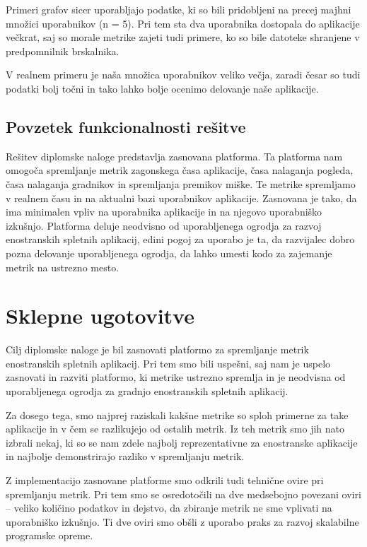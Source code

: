 \documentclass[a4paper, 12pt]{book}
\begin{document}
Primeri grafov sicer uporabljajo podatke, ki so bili pridobljeni na precej majhni množici uporabnikov (n = 5). Pri tem sta dva uporabnika dostopala do aplikacije večkrat, saj so morale metrike zajeti tudi primere, ko so bile datoteke shranjene v predpomnilnik brskalnika.

V realnem primeru je naša množica uporabnikov veliko večja, zaradi česar so tudi podatki bolj točni in tako lahko bolje ocenimo delovanje naše aplikacije.

\section{Povzetek funkcionalnosti rešitve}

Rešitev diplomske naloge predstavlja zasnovana platforma. Ta platforma nam omogoča spremljanje metrik zagonskega časa aplikacije, časa nalaganja pogleda, časa nalaganja gradnikov in spremljanja premikov miške. Te metrike spremljamo v realnem času in na aktualni bazi uporabnikov aplikacije. Zasnovana je tako, da ima minimalen vpliv na uporabnika aplikacije in na njegovo uporabniško izkušnjo. Platforma deluje neodvisno od uporabljenega ogrodja za razvoj enostranskih spletnih aplikacij, edini pogoj za uporabo je ta, da razvijalec dobro pozna delovanje uporabljenega ogrodja, da lahko umesti kodo za zajemanje metrik na ustrezno mesto.

\chapter{Sklepne ugotovitve}
\label{ch4}

Cilj diplomske naloge je bil zasnovati platformo za spremljanje metrik enostranskih spletnih aplikacij. Pri tem smo bili uspešni, saj nam je uspelo zasnovati in razviti platformo, ki metrike ustrezno spremlja in je neodvisna od uporabljenega ogrodja za gradnjo enostranskih spletnih aplikacij.

Za dosego tega, smo najprej raziskali kakšne metrike so sploh primerne za take aplikacije in v čem se razlikujejo od ostalih metrik. Iz teh metrik smo jih nato izbrali nekaj, ki so se nam zdele najbolj reprezentativne za enostranske aplikacije in najbolje demonstrirajo razliko v spremljanju metrik.

Z implementacijo zasnovane platforme smo odkrili tudi tehnične ovire pri spremljanju metrik. Pri tem smo se osredotočili na dve medsebojno povezani oviri -- veliko količino podatkov in dejstvo, da zbiranje metrik ne sme vplivati na uporabniško izkušnjo. Ti dve oviri smo obšli z uporabo praks za razvoj skalabilne programske opreme.
\end{document}
